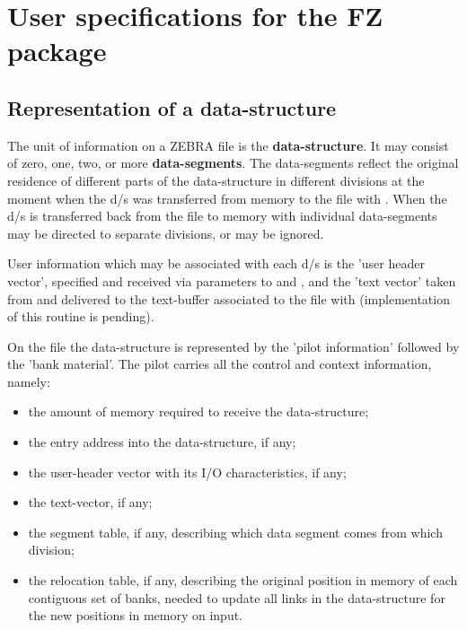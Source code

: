 \chapter{User specifications for the FZ package}
\label{sec:H1-FZ-userspecs}

\section{Representation of a data-structure}

The unit of information on a ZEBRA file is the
\textbf{data-structure}.
It may consist of zero, one, two, or more
\textbf{data-segments}.
The data-segments reflect the original residence of different
parts of the data-structure in different divisions at the
moment when the d/s was transferred from memory to the file with
.
When the d/s is transferred back from the file to memory with 
individual data-segments may be directed to separate divisions,
or may be ignored.

User information which may be associated with each d/s is
the 'user header vector',
specified and received via parameters to  and ,
and the 'text vector' taken from and delivered to the text-buffer
associated to the file with  (implementation of this routine
is pending).

On the file the data-structure is represented
by the 'pilot information' followed by the 'bank material'.
The pilot carries all the control and context information,
namely:

\begin{itemize}
\item the amount of memory required to receive the data-structure;
\item the entry address into the data-structure, if any;
\item the user-header vector with its I/O characteristics, if any;
\item the text-vector, if any;
\item the segment table, if any, describing which data segment comes
      from which division;
\item the relocation table, if any, describing the original position
      in memory of each contiguous set of banks, needed to update
      all links in the data-structure for the new positions in
      memory on input.
\end{itemize}

